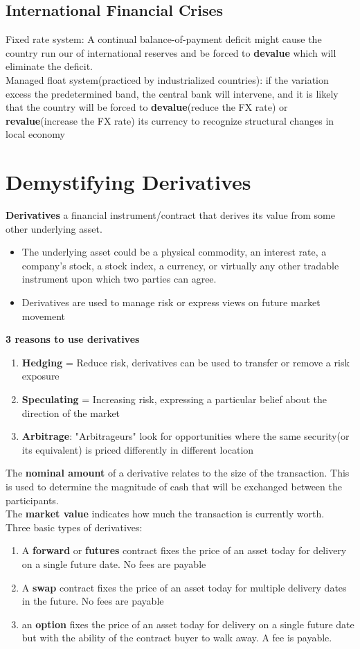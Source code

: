 \documentclass{article}
\theoremstyle{definition}
\theoremstyle{thrm}
\theoremstyle{lma}
\theoremstyle{ppst}
\theoremstyle{crlr}
\begin{document}
\subsection{International Financial Crises}
Fixed rate system: A continual balance-of-payment deficit might cause the country run our of international reserves and be forced to \textbf{devalue} which will eliminate the deficit.\\
Managed float system(practiced by industrialized countries): if the variation excess the predetermined band, the central bank will intervene, and it is likely that the country will be forced to \textbf{devalue}(reduce the FX rate) or \textbf{revalue}(increase the FX rate) its currency to recognize structural changes in local economy


\section{Demystifying Derivatives}
\textbf{Derivatives} a financial instrument/contract that derives its value from some other underlying asset.
\begin{itemize}
	\item The underlying asset could be a physical commodity, an interest rate, a company's stock, a stock index, a currency, or virtually any other tradable instrument upon which two parties can agree.
	\item Derivatives are used to manage risk or express views on future market movement
\end{itemize}
\textbf{3 reasons to use derivatives}
\begin{enumerate}
	\item \textbf{Hedging} = Reduce risk, derivatives can be used to transfer or remove a risk exposure
	\item \textbf{Speculating} = Increasing risk, expressing a particular belief about the direction of the market
	\item \textbf{Arbitrage}: "Arbitrageurs" look for opportunities where the same security(or its equivalent) is priced differently in different location
\end{enumerate}
The \textbf{nominal amount} of a derivative relates to the size of the transaction. This is used to determine the magnitude of cash that will be exchanged between the participants.\\
The \textbf{market value} indicates how much the transaction is currently worth. \\
Three basic types of derivatives:
\begin{enumerate}
	\item A \textbf{forward} or \textbf{futures} contract fixes the price of an asset today for delivery on a single future date. No fees are payable
	\item A \textbf{swap} contract fixes the price of an asset today for multiple delivery dates in the future. No fees are payable
	\item an \textbf{option} fixes the price of an asset today for delivery on a single future date but with the ability of the contract buyer to walk away. A fee is payable.
\end{enumerate}
\end{document}
